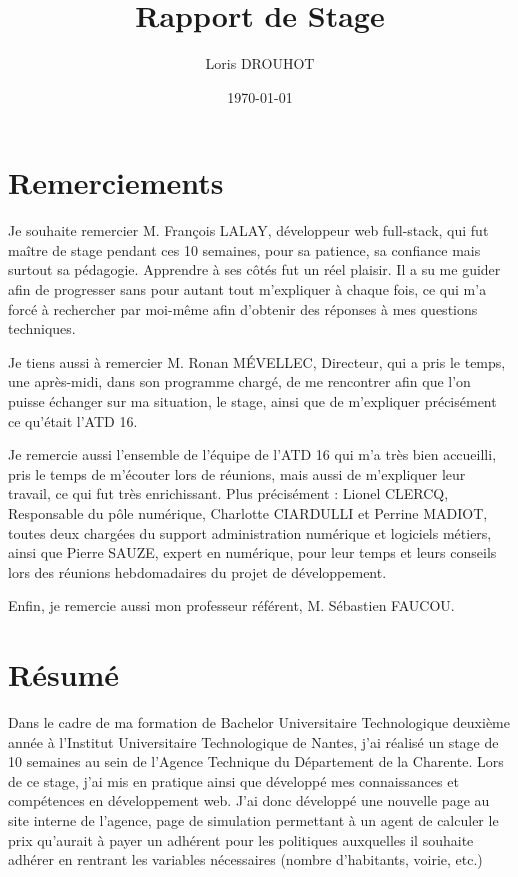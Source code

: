 \documentclass[a4paper,12pt]{report}
\title{Rapport de Stage}
\author{Loris DROUHOT}
\date{\today}
\begin{document}
\maketitle
\newpage
\thispagestyle{empty}

\chapter*{Remerciements}

Je souhaite remercier M. François LALAY, développeur web full-stack, qui fut maître de stage pendant ces 10 semaines, pour sa patience, sa confiance mais surtout sa pédagogie. Apprendre à ses côtés fut un réel plaisir. Il a su me guider afin de progresser sans pour autant tout m'expliquer à chaque fois, ce qui m’a forcé à rechercher par moi-même afin d’obtenir des réponses à mes questions techniques.

\vspace{1em}

Je tiens aussi à remercier M. Ronan MÉVELLEC, Directeur, qui a pris le temps, une après-midi, dans son programme chargé, de me rencontrer afin que l’on puisse échanger sur ma situation, le stage, ainsi que de m’expliquer précisément ce qu’était l’ATD 16.

\vspace{1em}

Je remercie aussi l’ensemble de l’équipe de l’ATD 16 qui m’a très bien accueilli, pris le temps de m’écouter lors de réunions, mais aussi de m’expliquer leur travail, ce qui fut très enrichissant. Plus précisément : Lionel CLERCQ, Responsable du pôle numérique, Charlotte CIARDULLI et Perrine MADIOT, toutes deux chargées du support administration numérique et logiciels métiers, ainsi que Pierre SAUZE, expert en numérique, pour leur temps et leurs conseils lors des réunions hebdomadaires du projet de développement.

\vspace{1em}

Enfin, je remercie aussi mon professeur référent, M. Sébastien FAUCOU.

\newpage
\chapter*{Résumé}
\thispagestyle{empty}

Dans le cadre de ma formation de Bachelor Universitaire Technologique deuxième année à l’Institut Universitaire Technologique de Nantes, j’ai réalisé un stage de 10 semaines au sein de l’Agence Technique du Département de la Charente. Lors de ce stage, j’ai mis en pratique ainsi que développé mes connaissances et compétences en développement web. J’ai donc développé une nouvelle page au site interne de l’agence, page de simulation permettant à un agent de calculer le prix qu’aurait à payer un adhérent pour les politiques auxquelles il souhaite adhérer en rentrant les variables nécessaires (nombre d’habitants, voirie, etc.)
\end{document}
